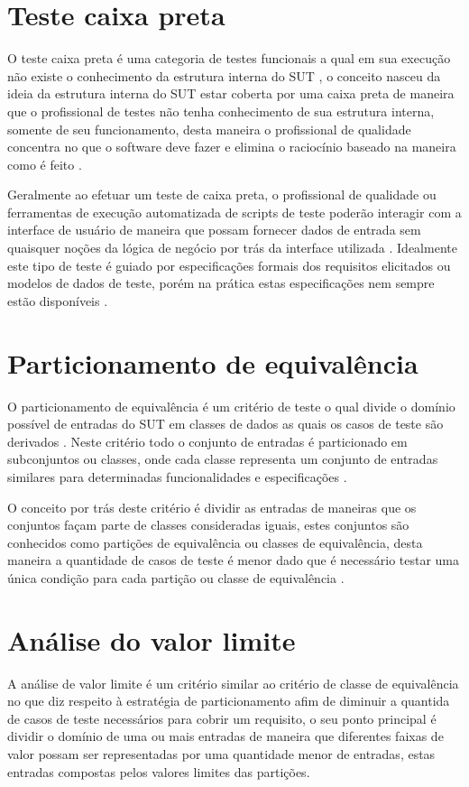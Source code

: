 \documentclass[
	12pt,				%
	oneside,			%
	a4paper,			%
	english,			%
	brazil				%
	]{abntex2ppgsi}
\begin{document}
\section{Teste caixa preta}

O teste caixa preta é uma categoria de testes funcionais a qual em sua execução não existe o conhecimento da estrutura interna do SUT \cite{Xu2016},  o conceito nasceu da ideia da estrutura interna do SUT estar coberta por uma caixa preta de maneira que o profissional de testes não tenha conhecimento de sua estrutura interna, somente de seu funcionamento, desta maneira o profissional de qualidade concentra no que o software deve fazer e elimina o raciocínio baseado na maneira como é feito \cite{Jacob2016}.

Geralmente ao efetuar um teste de caixa preta, o profissional de qualidade ou ferramentas de execução automatizada de scripts de teste poderão interagir com a interface de usuário de maneira que possam fornecer dados de entrada sem quaisquer noções da lógica de negócio por trás da interface utilizada \cite{Xu2016}. Idealmente este tipo de teste é guiado por especificações formais dos requisitos elicitados ou modelos de dados de teste, porém na prática estas especificações nem sempre estão disponíveis \cite{Walkinshaw2017}.

\section{Particionamento de equivalência}
O particionamento de equivalência é um critério de teste o qual divide o domínio possível de entradas do SUT em classes de dados as quais os casos de teste são derivados  \cite{Jacob2016}. Neste critério  todo o conjunto de entradas é particionado em subconjuntos ou classes, onde cada classe representa um conjunto de entradas similares para determinadas funcionalidades e especificações \cite{Jacob2016}.

O conceito por trás deste critério  é dividir as entradas de maneiras que os conjuntos façam parte de classes consideradas iguais, estes conjuntos são conhecidos como partições de equivalência ou classes de equivalência, desta maneira a quantidade de casos de teste  é menor dado que é necessário testar uma única condição para cada partição ou classe de equivalência \cite{Jacob2016}.

\section{Análise do valor limite}
A análise de valor limite é um critério similar ao critério de classe de equivalência no que diz respeito à estratégia de particionamento afim de diminuir a quantida de casos de teste necessários para cobrir um requisito, o seu ponto principal é dividir o domínio de uma ou mais entradas de maneira que diferentes faixas de valor possam ser representadas por uma quantidade menor de entradas, estas entradas compostas pelos valores limites das partições.
\end{document}
